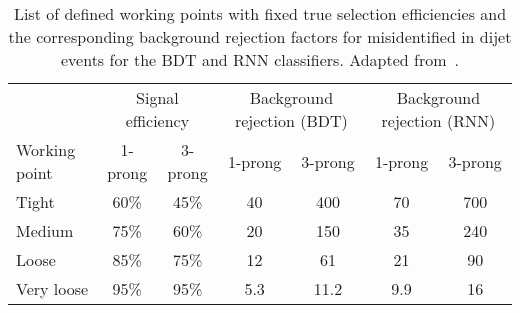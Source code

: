 \begin{table}
  \centering

  \caption{List of defined working points with fixed true \tauhadvis
    selection efficiencies and the corresponding background rejection
    factors for misidentified \tauhadvis in dijet events for the BDT
    and RNN classifiers. Adapted from~\cite{ATL-PHYS-PUB-2019-033}.}%
  \label{tab:rnn_wps}

  \begin{tabular}{lcccccc}
    \toprule
                  & \multicolumn{2}{c}{Signal efficiency} & \multicolumn{2}{c}{Background rejection (BDT)} & \multicolumn{2}{c}{Background rejection (RNN)} \\
    Working point  & 1-prong & 3-prong & 1-prong & 3-prong & 1-prong & 3-prong \\
    \midrule
    Tight          & 60\%    & 45\%    & 40      & 400  & 70   & 700 \\
    Medium         & 75\%    & 60\%    & 20      & 150  & 35   & 240 \\
    Loose          & 85\%    & 75\%    & 12      & 61   & 21   & 90  \\
    Very loose     & 95\%    & 95\%    & 5.3     & 11.2 & 9.9  & 16  \\
    \bottomrule
  \end{tabular}
\end{table}

